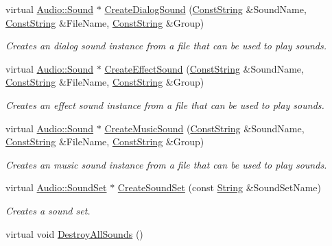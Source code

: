 \begin{DoxyCompactItemize}
virtual \hyperlink{classMezzanine_1_1Audio_1_1Sound}{Audio::Sound} $\ast$ \hyperlink{classMezzanine_1_1AudioManager_ada9827e181e8c8cfc31d290ccb9f6c46}{CreateDialogSound} (\hyperlink{namespaceMezzanine_a63cd699ac54b73953f35ec9cfc05e506}{ConstString} \&SoundName, \hyperlink{namespaceMezzanine_a63cd699ac54b73953f35ec9cfc05e506}{ConstString} \&FileName, \hyperlink{namespaceMezzanine_a63cd699ac54b73953f35ec9cfc05e506}{ConstString} \&Group)
\begin{DoxyCompactList}\small\item\em Creates an dialog sound instance from a file that can be used to play sounds. \item\end{DoxyCompactList}\item 
virtual \hyperlink{classMezzanine_1_1Audio_1_1Sound}{Audio::Sound} $\ast$ \hyperlink{classMezzanine_1_1AudioManager_ab2573d44cfe6e0f8e3d1f0dc794c36a5}{CreateEffectSound} (\hyperlink{namespaceMezzanine_a63cd699ac54b73953f35ec9cfc05e506}{ConstString} \&SoundName, \hyperlink{namespaceMezzanine_a63cd699ac54b73953f35ec9cfc05e506}{ConstString} \&FileName, \hyperlink{namespaceMezzanine_a63cd699ac54b73953f35ec9cfc05e506}{ConstString} \&Group)
\begin{DoxyCompactList}\small\item\em Creates an effect sound instance from a file that can be used to play sounds. \item\end{DoxyCompactList}\item 
virtual \hyperlink{classMezzanine_1_1Audio_1_1Sound}{Audio::Sound} $\ast$ \hyperlink{classMezzanine_1_1AudioManager_a157de9927fb561655b74267d9c375034}{CreateMusicSound} (\hyperlink{namespaceMezzanine_a63cd699ac54b73953f35ec9cfc05e506}{ConstString} \&SoundName, \hyperlink{namespaceMezzanine_a63cd699ac54b73953f35ec9cfc05e506}{ConstString} \&FileName, \hyperlink{namespaceMezzanine_a63cd699ac54b73953f35ec9cfc05e506}{ConstString} \&Group)
\begin{DoxyCompactList}\small\item\em Creates an music sound instance from a file that can be used to play sounds. \item\end{DoxyCompactList}\item 
virtual \hyperlink{classMezzanine_1_1Audio_1_1SoundSet}{Audio::SoundSet} $\ast$ \hyperlink{classMezzanine_1_1AudioManager_ac4a92b861868203186e7f238bd2f816c}{CreateSoundSet} (const \hyperlink{namespaceMezzanine_acf9fcc130e6ebf08e3d8491aebcf1c86}{String} \&SoundSetName)
\begin{DoxyCompactList}\small\item\em Creates a sound set. \item\end{DoxyCompactList}\item 
\hypertarget{classMezzanine_1_1AudioManager_aa9b51e38b4a9b1a1b1efce10fc10f0ee}{
virtual void \hyperlink{classMezzanine_1_1AudioManager_aa9b51e38b4a9b1a1b1efce10fc10f0ee}{DestroyAllSounds} ()}
\label{classMezzanine_1_1AudioManager_aa9b51e38b4a9b1a1b1efce10fc10f0ee}


\end{DoxyCompactItemize}
